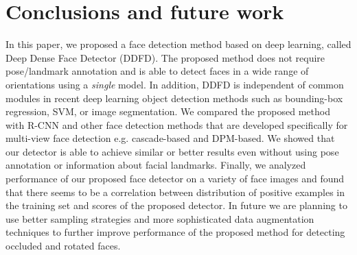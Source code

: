 \documentclass{sig-alternate-2013}
\begin{document}
%



\section{Conclusions and future work}
In this paper, we proposed a face detection method based on deep learning, called Deep Dense Face Detector (DDFD).  The proposed method does not require pose/landmark annotation and is able to detect faces in a wide range of orientations using a \textit{single} model. In addition, DDFD is independent of common modules in recent deep learning object detection methods such as bounding-box regression, SVM, or image segmentation. We compared the proposed method with R-CNN and  other face detection methods that are developed specifically for multi-view face detection e.g. cascade-based and DPM-based. We showed that our detector is able to achieve similar or better results even without using pose annotation or information about facial landmarks. Finally, we analyzed performance of our proposed face detector on a variety of face images and found that there seems to be a correlation between distribution of positive examples in the training set and scores of the proposed detector. In future we are planning to use better sampling strategies and more sophisticated data augmentation techniques to further improve performance of the proposed method for detecting occluded and rotated faces. 

\end{document}

